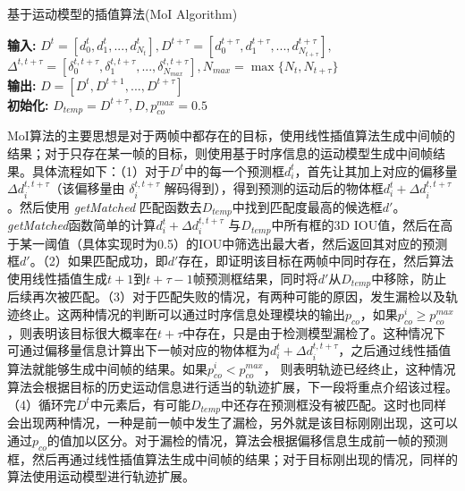 \begin{algorithm}[!h]
	\caption{基于运动模型的插值算法(MoI Algorithm)}
	\label{alg:interpolation}
	\textbf{输入: } $D^t= [d^t_0, d^t_1, ..., d^t_{N_t}], D^{t+\tau}= [d^{t+\tau}_0, d^{t+\tau}_1, ..., d^{t+\tau}_{N_{t+\tau}}],$
	$\Delta^{t, t+\tau}=[\delta^{t, t+\tau}_0, \delta^{t, t+\tau}_1, ..., \delta^{t, t+\tau}_{N_{max}}], N_{max} = \max\{N_t, N_{t+\tau}\}$\\
	\textbf{输出: } $D = [D^t, D^{t+1}, ..., D^{t+\tau}]$\\
	\textbf{初始化:} $D_{temp} = D^{t+\tau}, D, p_{co}^{max} = 0.5$ \\
\end{algorithm}

MoI算法的主要思想是对于两帧中都存在的目标，使用线性插值算法生成中间帧的结果；对于只存在某一帧的目标，则使用基于时序信息的运动模型生成中间帧结果。具体流程如下：（1）对于$D^t$中的每一个预测框$d^t_i$，首先让其加上对应的偏移量$\Delta d_i^{t,t+\tau}$（该偏移量由 $\delta_i^{t,t+\tau}$ 解码得到），得到预测的运动后的物体框$d^t_i + \Delta d_i^{t,t+\tau}$。然后使用 \textit{getMatched} 匹配函数去$D_{temp}$中找到匹配度最高的候选框$d'$。\textit{getMatched}函数简单的计算$d^t_i + \Delta d_i^{t,t+\tau}$ 与$D_{temp}$中所有框的3D IOU值，然后在高于某一阈值（具体实现时为0.5）的IOU中筛选出最大者，然后返回其对应的预测框$d'$。（2）如果匹配成功，即$d'$存在，即证明该目标在两帧中同时存在，然后算法使用线性插值生成$t+1$到$t+\tau-1$帧预测框结果，同时将$d'$从$D_{temp}$中移除，防止后续再次被匹配。（3）对于匹配失败的情况，有两种可能的原因，发生漏检以及轨迹终止。这两种情况的判断可以通过时序信息处理模块的输出$p_{co}$，如果$p_{co}^i \geq p_{co}^{max}$，则表明该目标很大概率在$t+\tau$中存在，只是由于检测模型漏检了。这种情况下可通过偏移量信息计算出下一帧对应的物体框为$d^t_i + \Delta d^{t, t+ \tau}_{i}$，之后通过线性插值算法就能够生成中间帧的结果。如果$p_{co}^i < p_{co}^{max}$， 则表明轨迹已经终止，这种情况算法会根据目标的历史运动信息进行适当的轨迹扩展，下一段将重点介绍该过程。（4）循环完$D^t$中元素后，有可能$D_{temp}$中还存在预测框没有被匹配。这时也同样会出现两种情况，一种是前一帧中发生了漏检，另外就是该目标刚刚出现，这可以通过$p_{co}$的值加以区分。对于漏检的情况，算法会根据偏移信息生成前一帧的预测框，然后再通过线性插值算法生成中间帧的结果；对于目标刚出现的情况，同样的算法使用运动模型进行轨迹扩展。

